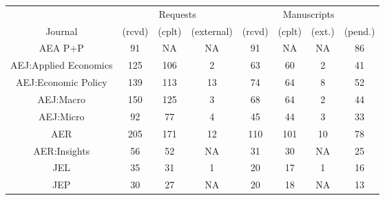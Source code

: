 
\begin{tabular}{@{\extracolsep{5pt}} cccccccc} 
\toprule 
        & \multicolumn{3}{c}{Requests} & \multicolumn{4}{c}{Manuscripts}\\
\cmidrule{2-4}\cmidrule{5-8}
Journal & (rcvd) & (cplt) & (external) & (rcvd) & (cplt) & (ext.) & (pend.) \\ 
\midrule AEA P+P & 91 & NA & NA & 91 & NA & NA & 86 \\ 
AEJ:Applied Economics & 125 & 106 & 2 & 63 & 60 & 2 & 41 \\ 
AEJ:Economic Policy & 139 & 113 & 13 & 74 & 64 & 8 & 52 \\ 
AEJ:Macro & 150 & 125 & 3 & 68 & 64 & 2 & 44 \\ 
AEJ:Micro & 92 & 77 & 4 & 45 & 44 & 3 & 33 \\ 
AER & 205 & 171 & 12 & 110 & 101 & 10 & 78 \\ 
AER:Insights & 56 & 52 & NA & 31 & 30 & NA & 25 \\ 
JEL & 35 & 31 & 1 & 20 & 17 & 1 & 16 \\ 
JEP & 30 & 27 & NA & 20 & 18 & NA & 13 \\ 
\bottomrule 
\end{tabular} 
